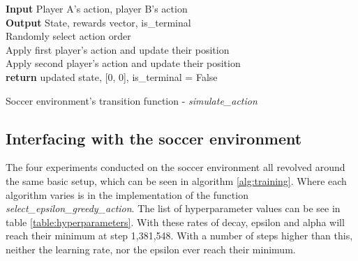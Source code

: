 \documentclass[conference]{IEEEtran}
\begin{document}
\begin{algorithm}
    \label{alg:soccer-env}
    \SetAlgoLined
    {\algorithmicindent} \textbf{Input} Player A's action, player B's action \\
    {\algorithmicindent} \textbf{Output} State, rewards vector, is\_terminal \\
    Randomly select action order \\
    Apply first player's action and update their position \\
    Apply second player's action and update their position \\
    \textbf{return} updated state, [0, 0], is\_terminal = False
    \caption{Soccer environment's transition function - \textit{simulate\_action}}
\end{algorithm}

\subsection{Interfacing with the soccer environment}
The four experiments conducted on the soccer environment all revolved around the same basic setup, which can be seen in algorithm \ref{alg:training}. Where each algorithm varies is in the implementation of the function \textit{select\_epsilon\_greedy\_action}. The list of hyperparameter values can be see in table \ref{table:hyperparameters}. With these rates of decay, epsilon and alpha will reach their minimum at step 1,381,548. With a number of steps higher than this, neither the learning rate, nor the epsilon ever reach their minimum.
\end{document}
